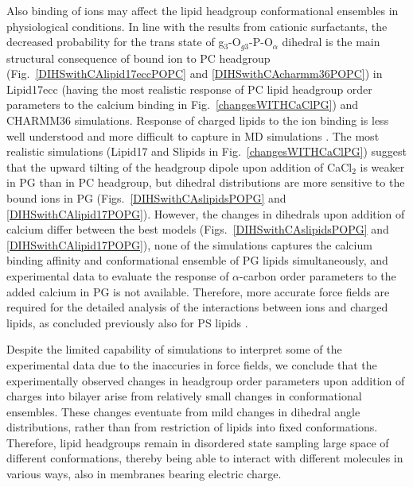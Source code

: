 \documentclass[aps,prl,superscriptaddress,twocolumn]{revtex4}
\begin{document}
Also binding of ions may affect the lipid headgroup conformational ensembles in physiological conditions.
In line with the results from cationic surfactants, 
the decreased probability for the trans state of g$_3$-O$_{g3}$-P-O$_\alpha$ dihedral is the main structural consequence of
bound ion to PC headgroup (Fig.~\ref{DIHSwithCAlipid17eccPOPC} and \ref{DIHSwithCAcharmm36POPC}) in
Lipid17ecc (having the most realistic response of PC lipid headgroup order parameters to the calcium binding in Fig.~\ref{changesWITHCaClPG})
and CHARMM36 simulations.
Response of charged lipids to the ion binding is less well understood and more difficult to capture in MD simulations \cite{antila19,melcr20}.
The most realistic simulations (Lipid17 and Slipids in Fig.~\ref{changesWITHCaClPG}) suggest
that the upward tilting of the headgroup dipole upon addition of CaCl$_2$ is weaker in PG than in PC headgroup,
but dihedral distributions are more sensitive to the bound ions in PG (Figs.~\ref{DIHSwithCAslipidsPOPG} and \ref{DIHSwithCAlipid17POPG}).
However, the changes in dihedrals upon addition of calcium differ between the best models (Figs.~\ref{DIHSwithCAslipidsPOPG} and \ref{DIHSwithCAlipid17POPG}),
none of the simulations captures the calcium binding affinity and conformational ensemble of PG lipids simultaneously, and experimental data to evaluate the response of $\alpha$-carbon order parameters to the added calcium in PG is not available.
Therefore, more accurate force fields are required for the detailed analysis of the interactions between ions and charged lipids, as concluded previously also for PS lipids \cite{antila19,melcr20}.

Despite the limited capability of simulations to interpret some of the experimental data due to
the inaccuries in force fields, we conclude that the experimentally observed changes
in headgroup order parameters upon addition of charges into bilayer arise from relatively
small changes in conformational ensembles. These changes eventuate from
mild changes in dihedral angle distributions, rather than from restriction of lipids into
fixed conformations. Therefore, lipid headgroups remain in disordered state sampling large
space of different conformations, thereby being able to interact with different molecules
in various ways, also in membranes bearing electric charge.
\end{document}
